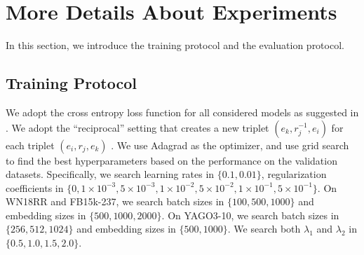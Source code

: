 \documentclass{article}
\begin{document}
\section{More Details About Experiments}
In this section, we introduce the training protocol and the evaluation protocol.
\begin{table}[t]
    \centering
    \caption{Hyperparameters found by grid search. $k$ is the embedding size, $b$ is the batch size, $\lambda$ is the regularization coefficients, and $\lambda_1$ and $\lambda_2$ are weights for different parts of the regularizer.}
    \label{table:hp}
    \vskip 0.1in
   
\end{table}
\subsection{Training Protocol} 
We adopt the cross entropy loss function for all considered models as suggested in \citet{old_dog}. We adopt the ``reciprocal'' setting that creates a new triplet $(e_k,r_j^{-1},e_i)$ for each triplet  $(e_i,r_j,e_k)$ \cite{n3,simple}. We use Adagrad \citep{adagrad} as the optimizer, and use grid search to find the best hyperparameters based on the performance on the validation datasets. Specifically, we search learning rates in $\{0.1, 0.01\}$, regularization coefficients in $\{0, 1\times 10^{-3}, 5\times 10^{-3}, 1\times 10^{-2}, 5\times 10^{-2}, 1\times 10^{-1}, 5\times 10^{-1}\}$. On WN18RR and FB15k-237, we search batch sizes in $\{100,500,1000\}$ and embedding sizes in $\{500,1000,2000\}$. On YAGO3-10, we search batch sizes in $\{256,512,1024\}$ and embedding sizes in $\{500,1000\}$. 
We search both $\lambda_1$ and $\lambda_2$ in $\{0.5, 1.0, 1.5, 2.0\}$.
\end{document}
